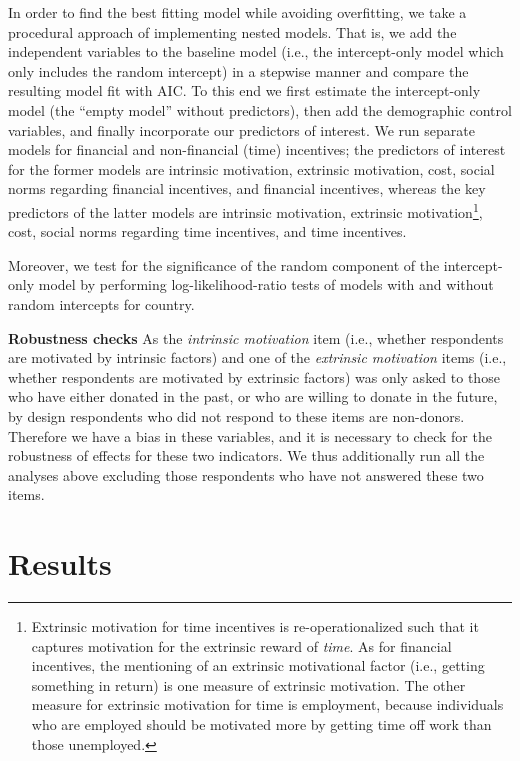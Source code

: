 \documentclass[AER]{AEA}
\begin{document}
In order to find the best fitting model while avoiding overfitting, we take a procedural approach of implementing nested models. That is, we add the independent variables to the baseline model (i.e., the intercept-only model which only includes the random intercept) in a stepwise manner and compare the resulting model fit with AIC. To this end we first estimate the intercept-only model (the “empty model” without predictors), then add the demographic control variables, and finally incorporate our predictors of interest. We run separate models for financial and non-financial (time) incentives; the predictors of interest for the former models are intrinsic motivation, extrinsic motivation, cost, social norms regarding financial incentives, and financial incentives, whereas the key predictors of the latter models are intrinsic motivation, extrinsic motivation\footnote{Extrinsic motivation for time incentives is re-operationalized such that it captures motivation for the extrinsic reward of \textit{time}. As for financial incentives, the mentioning of an extrinsic motivational factor (i.e., getting something in return) is one measure of extrinsic motivation. The other measure for extrinsic motivation for time is employment, because individuals who are employed should be motivated more by getting time off work than those unemployed.}, cost, social norms regarding time incentives, and time incentives. 

Moreover, we test for the significance of the random component of the intercept-only model by performing log-likelihood-ratio tests of models with and without random intercepts for country.

\textbf{Robustness checks} As the \textit{intrinsic motivation} item (i.e., whether respondents are motivated by intrinsic factors) and one of the \textit{extrinsic motivation} items (i.e., whether respondents are motivated by extrinsic factors) was only asked to those who have either donated in the past, or who are willing to donate in the future, by design respondents who did not respond to these items are non-donors. Therefore we have a bias in these variables, and it is necessary to check for the robustness of effects for these two indicators. We thus additionally run all the analyses above excluding those respondents who have not answered these two items. 

\section{Results}
\end{document}
